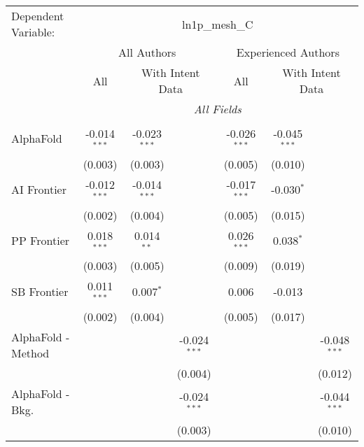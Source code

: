 \begingroup
\centering
\begin{tabular}{lcccccc}
   \tabularnewline \midrule \midrule
   Dependent Variable: & \multicolumn{6}{c}{ln1p\_mesh\_C}\\
 & \multicolumn{3}{c}{All Authors} & \multicolumn{3}{c}{Experienced Authors} \\
\cmidrule(lr){2-4} \cmidrule(lr){5-7}
 & \multicolumn{1}{c}{All} & \multicolumn{2}{c}{With Intent Data} & \multicolumn{1}{c}{All} & \multicolumn{2}{c}{With Intent Data} \\
\cmidrule(lr){2-2} \cmidrule(lr){3-4} \cmidrule(lr){5-5} \cmidrule(lr){6-7}
 & \multicolumn{6}{c}{\textit{All Fields}} \\ \\
   AlphaFold            & -0.014$^{***}$ & -0.023$^{***}$ &                & -0.026$^{***}$ & -0.045$^{***}$ &   \\   
                        & (0.003)        & (0.003)        &                & (0.005)        & (0.010)        &   \\   
   AI Frontier          & -0.012$^{***}$ & -0.014$^{***}$ &                & -0.017$^{***}$ & -0.030$^{*}$   &   \\   
                        & (0.002)        & (0.004)        &                & (0.005)        & (0.015)        &   \\   
   PP Frontier          & 0.018$^{***}$  & 0.014$^{**}$   &                & 0.026$^{***}$  & 0.038$^{*}$    &   \\   
                        & (0.003)        & (0.005)        &                & (0.009)        & (0.019)        &   \\   
   SB Frontier          & 0.011$^{***}$  & 0.007$^{*}$    &                & 0.006          & -0.013         &   \\   
                        & (0.002)        & (0.004)        &                & (0.005)        & (0.017)        &   \\   
   AlphaFold - Method   &                &                & -0.024$^{***}$ &                &                & -0.048$^{***}$\\   
                        &                &                & (0.004)        &                &                & (0.012)\\   
   AlphaFold - Bkg.     &                &                & -0.024$^{***}$ &                &                & -0.044$^{***}$\\   
                        &                &                & (0.003)        &                &                & (0.010)\\   

\end{tabular}

